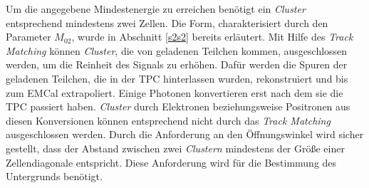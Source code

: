 Um die angegebene Mindestenergie zu erreichen benötigt ein \textit{Cluster} entsprechend mindestens zwei Zellen.
Die Form, charakterisiert durch den Parameter $M_{02}$, wurde in Abschnitt \ref{s2s2} bereits erläutert.
Mit Hilfe des \textit{Track Matching} können \textit{Cluster}, die von geladenen Teilchen kommen, ausgeschlossen werden, um die Reinheit des Signals zu erhöhen.
Dafür werden die Spuren der geladenen Teilchen, die in der TPC hinterlassen wurden, rekonstruiert und bis zum EMCal extrapoliert.
Einige Photonen konvertieren erst nach dem sie die TPC passiert haben.
\textit{Cluster} durch Elektronen beziehungsweise Positronen aus diesen Konversionen können entsprechend nicht durch das \textit{Track Matching} ausgeschlossen werden. 
\newpage
\noindent
Durch die Anforderung an den Öffnungswinkel wird sicher gestellt, dass der Abstand zwischen zwei \textit{Clustern} mindestens der Größe einer Zellendiagonale entspricht.
Diese Anforderung wird für die Bestimmung des Untergrunds benötigt.
